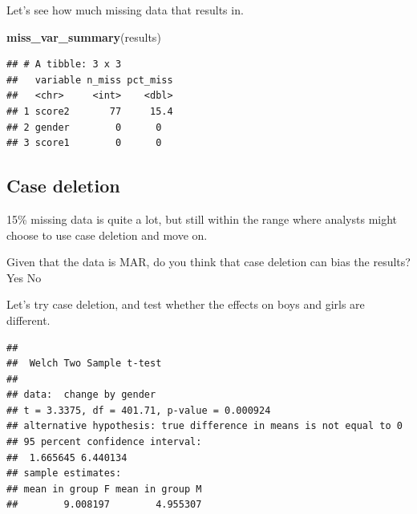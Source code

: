 \documentclass[
]{book}
\newenvironment{Shaded}{\begin{snugshade}}{\end{snugshade}}
\newcommand{\CommentTok}[1]{\textcolor[rgb]{0.56,0.35,0.01}{\textit{#1}}}
\newcommand{\DataTypeTok}[1]{\textcolor[rgb]{0.13,0.29,0.53}{#1}}
\newcommand{\KeywordTok}[1]{\textcolor[rgb]{0.13,0.29,0.53}{\textbf{#1}}}
\newcommand{\NormalTok}[1]{#1}
\newcommand{\OperatorTok}[1]{\textcolor[rgb]{0.81,0.36,0.00}{\textbf{#1}}}
\newcommand{\StringTok}[1]{\textcolor[rgb]{0.31,0.60,0.02}{#1}}
\begin{document}
Let's see how much missing data that results in.

\begin{Shaded}
\begin{Highlighting}[]
\KeywordTok{miss_var_summary}\NormalTok{(results)}
\end{Highlighting}
\end{Shaded}

\begin{verbatim}
## # A tibble: 3 x 3
##   variable n_miss pct_miss
##   <chr>     <int>    <dbl>
## 1 score2       77     15.4
## 2 gender        0      0  
## 3 score1        0      0
\end{verbatim}

\hypertarget{case-deletion}{%
\subsection{Case deletion}\label{case-deletion}}

15\% missing data is quite a lot, but still within the range where analysts might choose to use case deletion and move on.

Given that the data is MAR, do you think that case deletion can bias the results? Yes No

Let's try case deletion, and test whether the effects on boys and girls are different.

\begin{Shaded}
\end{Shaded}

\begin{verbatim}
## 
## 	Welch Two Sample t-test
## 
## data:  change by gender
## t = 3.3375, df = 401.71, p-value = 0.000924
## alternative hypothesis: true difference in means is not equal to 0
## 95 percent confidence interval:
##  1.665645 6.440134
## sample estimates:
## mean in group F mean in group M 
##        9.008197        4.955307
\end{verbatim}
\end{document}
